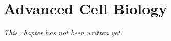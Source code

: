 \chapter{Advanced Cell Biology}\label{ch:b2:adv-cell}


\emph{This chapter has not been written yet.}
